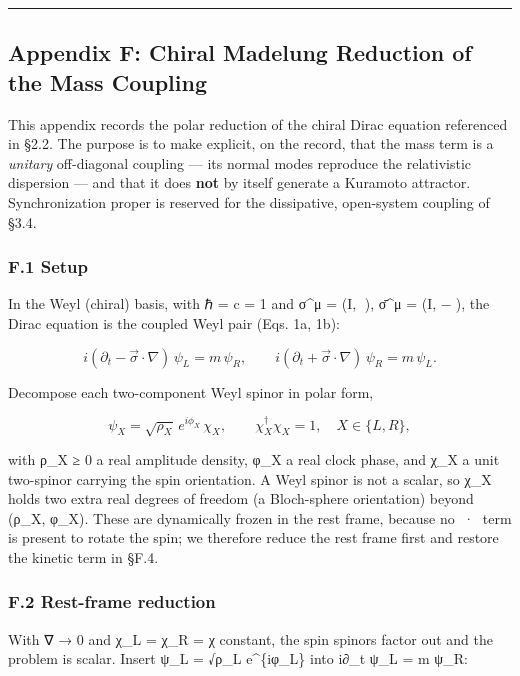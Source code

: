 \documentclass[
]{article}
\begin{document}
\begin{center}\rule{0.5\linewidth}{0.5pt}\end{center}

\subsection{Appendix F: Chiral Madelung Reduction of the Mass
Coupling}\label{appendix-f-chiral-madelung-reduction-of-the-mass-coupling}

This appendix records the polar reduction of the chiral Dirac equation
referenced in §2.2. The purpose is to make explicit, on the record, that
the mass term is a \emph{unitary} off-diagonal coupling --- its normal
modes reproduce the relativistic dispersion --- and that it does
\textbf{not} by itself generate a Kuramoto attractor. Synchronization
proper is reserved for the dissipative, open-system coupling of §3.4.

\subsubsection{F.1 Setup}\label{f.1-setup}

In the Weyl (chiral) basis, with ℏ = c = 1 and σ\^{}μ = (I, σ⃗), σ̄\^{}μ =
(I, −σ⃗), the Dirac equation is the coupled Weyl pair (Eqs. 1a, 1b):

\[i(\partial_t - \vec{\sigma}\cdot\nabla)\,\psi_L = m\,\psi_R, \qquad i(\partial_t + \vec{\sigma}\cdot\nabla)\,\psi_R = m\,\psi_L .\]

Decompose each two-component Weyl spinor in polar form,

\[\psi_X = \sqrt{\rho_X}\,e^{i\phi_X}\,\chi_X, \qquad \chi_X^\dagger\chi_X = 1, \quad X \in \{L, R\},\]

with ρ\_X ≥ 0 a real amplitude density, φ\_X a real clock phase, and
χ\_X a unit two-spinor carrying the spin orientation. A Weyl spinor is
not a scalar, so χ\_X holds two extra real degrees of freedom (a
Bloch-sphere orientation) beyond (ρ\_X, φ\_X). These are dynamically
frozen in the rest frame, because no σ⃗·∇ term is present to rotate the
spin; we therefore reduce the rest frame first and restore the kinetic
term in §F.4.

\subsubsection{F.2 Rest-frame reduction}\label{f.2-rest-frame-reduction}

With ∇ → 0 and χ\_L = χ\_R = χ constant, the spin spinors factor out and
the problem is scalar. Insert ψ\_L = √ρ\_L e\^{}\{iφ\_L\} into i∂\_t
ψ\_L = m ψ\_R:
\end{document}
